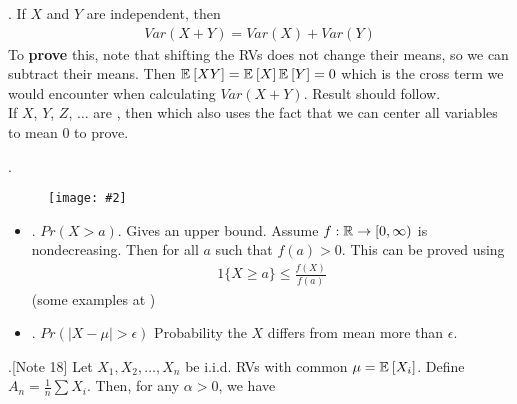 \documentclass[12pt]{article}
\newcommand\myfig[2][0.3\textwidth]{\begin{figure}[h!]\centering\texttt{[image: \#2]}\end{figure}}
\newcommand{\myspace}{\vspace{2\bigskipamount}}
\newcommand\p{\Needspace{12\baselineskip} \noindent}
\begin{document}
\myspace
{}

\myspace
\p {}. If $X$ and $Y$ are independent, then
\begin{align}
	Var(X + Y) = Var(X) + Var(Y)
\end{align}
To \textbf{prove} this, note that shifting the RVs does not change their means, so we can subtract their means. Then $\mathbb{E}_{}\left[XY\right] = \mathbb{E}_{}\left[X\right] \mathbb{E}_{}\left[Y\right] = 0$ which is the cross term we would encounter when calculating $Var(X + Y)$. Result should follow. \\

If $X$, $Y$, $Z$, $\ldots$ are , then 
which also uses the fact that we can center all variables to mean 0 to prove. 



\myspace
\p {}. \myfig[0.8\textwidth]{Inequalities.PNG}
\begin{itemize}
	\item \textbf{}. $Pr(X > a)$. Gives an upper bound. Assume $f: \mathbb{R} \rightarrow [0, \infty)$ is nondecreasing. Then
	for all $a$ such that $f(a) > 0$. This can be proved using 
	\begin{align}
		1\{X \ge a \} \le \frac{f(X)}{f(a)}
	\end{align}
	(some examples at \purple{[44:00]})
	
	\item \textbf{}. $Pr(|X - \mu| > \epsilon)$ Probability the $X$ differs from mean more than $\epsilon$. 
	
\end{itemize}


\myspace 
\p {}.[Note 18] Let $X_1, X_2, \ldots, X_n$ be i.i.d. RVs with common $\mu = \mathbb{E}_{}\left[X_i\right]$. Define $A_n = \frac{1}{n} \sum X_i$. Then, for any $\alpha > 0$, we have

\newcommand\ci[2]{\left[#1 - #2,~  #1 + #2\right]}
\end{document}
